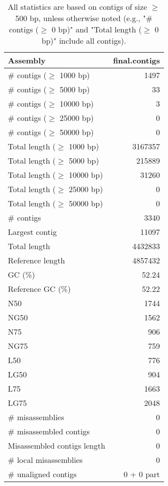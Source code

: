 \documentclass[12pt,a4paper]{article}
\begin{document}
\begin{table}[ht]
\begin{center}
\caption{All statistics are based on contigs of size $\geq$ 500 bp, unless otherwise noted (e.g., "\# contigs ($\geq$ 0 bp)" and "Total length ($\geq$ 0 bp)" include all contigs).}
\begin{tabular}{|l*{1}{|r}|}
\hline
Assembly & final.contigs \\ \hline
\# contigs ($\geq$ 1000 bp) & 1497 \\ \hline
\# contigs ($\geq$ 5000 bp) & 33 \\ \hline
\# contigs ($\geq$ 10000 bp) & 3 \\ \hline
\# contigs ($\geq$ 25000 bp) & 0 \\ \hline
\# contigs ($\geq$ 50000 bp) & 0 \\ \hline
Total length ($\geq$ 1000 bp) & 3167357 \\ \hline
Total length ($\geq$ 5000 bp) & 215889 \\ \hline
Total length ($\geq$ 10000 bp) & 31260 \\ \hline
Total length ($\geq$ 25000 bp) & 0 \\ \hline
Total length ($\geq$ 50000 bp) & 0 \\ \hline
\# contigs & 3340 \\ \hline
Largest contig & 11097 \\ \hline
Total length & 4432833 \\ \hline
Reference length & 4857432 \\ \hline
GC (\%) & 52.24 \\ \hline
Reference GC (\%) & 52.22 \\ \hline
N50 & 1744 \\ \hline
NG50 & 1562 \\ \hline
N75 & 906 \\ \hline
NG75 & 759 \\ \hline
L50 & 776 \\ \hline
LG50 & 904 \\ \hline
L75 & 1663 \\ \hline
LG75 & 2048 \\ \hline
\# misassemblies & 0 \\ \hline
\# misassembled contigs & 0 \\ \hline
Misassembled contigs length & 0 \\ \hline
\# local misassemblies & 0 \\ \hline
\# unaligned contigs & 0 + 0 part \\ \hline

\end{tabular}
\end{center}
\end{table}
\end{document}
